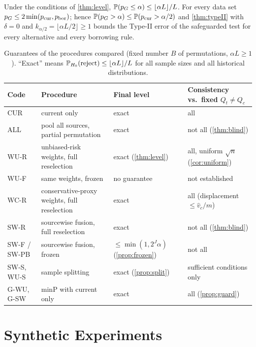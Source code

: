 \documentclass[11pt,a4paper]{article}
\begin{document}
\begin{proposition}[Safeguard]\label{prop:guard}
Under the conditions of \cref{thm:level}, $\P(p_G\le\alpha)\le\lfloor\alpha L\rfloor/L$. For every data set $p_G\le2\min(p_{\rm cur},p_{\rm bor})$; hence $\P(p_G>\alpha)\le\P(p_{\rm cur}>\alpha/2)$ and \cref{thm:typeII} with $\delta=0$ and $k_{\alpha/2}=\lfloor\alpha L/2\rfloor\ge1$ bounds the Type-II error of the safeguarded test for every alternative and every borrowing rule.
\end{proposition}

\begin{table}[t]
\centering\small
\caption{Guarantees of the procedures compared (fixed number $B$ of permutations, $\alpha L\ge1$). ``Exact'' means $\P_{H_0}(\text{reject})\le\lfloor\alpha L\rfloor/L$ for all sample sizes and all historical distributions.}\label{tab:guarantees}
\begin{tabularx}{\textwidth}{@{}l>{\raggedright\arraybackslash}X>{\raggedright\arraybackslash}p{2.9cm}>{\raggedright\arraybackslash}p{3.4cm}@{}}
\toprule
Code & Procedure & Final level & Consistency vs.\ fixed $Q_t\ne Q_c$\\
\midrule
CUR & current only & exact & all\\
ALL & pool all sources, partial permutation & exact & not all (\cref{thm:blind})\\
WU-R & unbiased-risk weights, full reselection & exact (\cref{thm:level}) & all, uniform $\sqrt n$ (\cref{cor:uniform})\\
WU-F & same weights, frozen & no guarantee & not established\\
WC-R & conservative-proxy weights, full reselection & exact & all (displacement $\le\hat v_c/m$)\\
SW-R & sourcewise fusion, full reselection & exact & not all (\cref{thm:blind})\\
SW-F / SW-PB & sourcewise fusion, frozen & $\le\min(1,2^J\alpha)$ (\cref{prop:frozen}) & not all\\
SW-S, WU-S & sample splitting & exact (\cref{prop:split}) & sufficient conditions only\\
G-WU, G-SW & minP with current only & exact & all (\cref{prop:guard})\\
\bottomrule
\end{tabularx}
\end{table}

\section{Synthetic Experiments}\label{sec:experiments}

\end{document}
